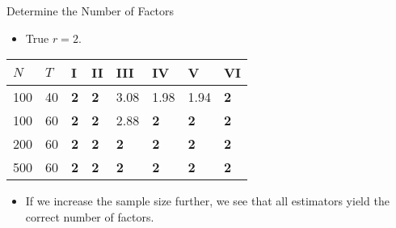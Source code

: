 \documentclass{beamer}
\begin{document}
\begin{frame}{Determine the Number of Factors}

\begin{itemize}
    \item True $r=2$.
\end{itemize}

\begin{table}[]
\begin{tabular}{l|l|l|l|l|l|l|l}
\hline
$N$ & $T$ & I & II & III & IV & V & VI \\ \hline
100 & 40 & \textbf 2 & \textbf 2 & 3.08 & 1.98 & 1.94 & \textbf 2 \\ \hline
100 & 60 & \textbf 2 & \textbf 2 & 2.88 & \textbf 2 & \textbf 2 & \textbf 2 \\ \hline
200 & 60 & \textbf 2 & \textbf 2 & \textbf 2 & \textbf 2 & \textbf 2 & \textbf 2 \\ \hline
500 & 60 & \textbf 2 & \textbf 2 & \textbf 2 & \textbf 2 & \textbf 2 & \textbf 2 \\ \hline
\end{tabular}
\end{table}


\begin{itemize}
    \item If we increase the sample size further, we see that all estimators yield the correct number of factors.
\end{itemize}
\end{frame}
\end{document}
